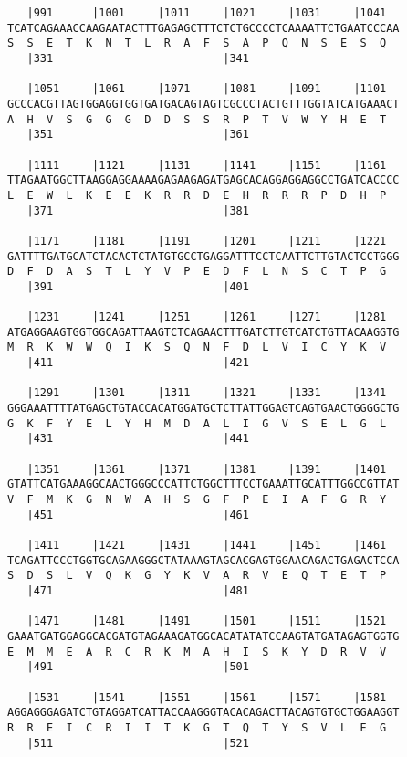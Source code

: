 \documentclass{article}
\begin{document}
\begin{Verbatim}
   |991      |1001     |1011     |1021     |1031     |1041  
TCATCAGAAACCAAGAATACTTTGAGAGCTTTCTCTGCCCCTCAAAATTCTGAATCCCAA
S  S  E  T  K  N  T  L  R  A  F  S  A  P  Q  N  S  E  S  Q  
   |331                          |341                       
  
   |1051     |1061     |1071     |1081     |1091     |1101  
GCCCACGTTAGTGGAGGTGGTGATGACAGTAGTCGCCCTACTGTTTGGTATCATGAAACT
A  H  V  S  G  G  G  D  D  S  S  R  P  T  V  W  Y  H  E  T  
   |351                          |361                       
  
   |1111     |1121     |1131     |1141     |1151     |1161  
TTAGAATGGCTTAAGGAGGAAAAGAGAAGAGATGAGCACAGGAGGAGGCCTGATCACCCC
L  E  W  L  K  E  E  K  R  R  D  E  H  R  R  R  P  D  H  P  
   |371                          |381                       
  
   |1171     |1181     |1191     |1201     |1211     |1221  
GATTTTGATGCATCTACACTCTATGTGCCTGAGGATTTCCTCAATTCTTGTACTCCTGGG
D  F  D  A  S  T  L  Y  V  P  E  D  F  L  N  S  C  T  P  G  
   |391                          |401                       
  
   |1231     |1241     |1251     |1261     |1271     |1281  
ATGAGGAAGTGGTGGCAGATTAAGTCTCAGAACTTTGATCTTGTCATCTGTTACAAGGTG
M  R  K  W  W  Q  I  K  S  Q  N  F  D  L  V  I  C  Y  K  V  
   |411                          |421                       
  
   |1291     |1301     |1311     |1321     |1331     |1341  
GGGAAATTTTATGAGCTGTACCACATGGATGCTCTTATTGGAGTCAGTGAACTGGGGCTG
G  K  F  Y  E  L  Y  H  M  D  A  L  I  G  V  S  E  L  G  L  
   |431                          |441                       
  
   |1351     |1361     |1371     |1381     |1391     |1401  
GTATTCATGAAAGGCAACTGGGCCCATTCTGGCTTTCCTGAAATTGCATTTGGCCGTTAT
V  F  M  K  G  N  W  A  H  S  G  F  P  E  I  A  F  G  R  Y  
   |451                          |461                       
  
   |1411     |1421     |1431     |1441     |1451     |1461  
TCAGATTCCCTGGTGCAGAAGGGCTATAAAGTAGCACGAGTGGAACAGACTGAGACTCCA
S  D  S  L  V  Q  K  G  Y  K  V  A  R  V  E  Q  T  E  T  P  
   |471                          |481                       
  
   |1471     |1481     |1491     |1501     |1511     |1521  
GAAATGATGGAGGCACGATGTAGAAAGATGGCACATATATCCAAGTATGATAGAGTGGTG
E  M  M  E  A  R  C  R  K  M  A  H  I  S  K  Y  D  R  V  V  
   |491                          |501                       
  
   |1531     |1541     |1551     |1561     |1571     |1581  
AGGAGGGAGATCTGTAGGATCATTACCAAGGGTACACAGACTTACAGTGTGCTGGAAGGT
R  R  E  I  C  R  I  I  T  K  G  T  Q  T  Y  S  V  L  E  G  
   |511                          |521                       
  

\end{Verbatim}
\end{document}
